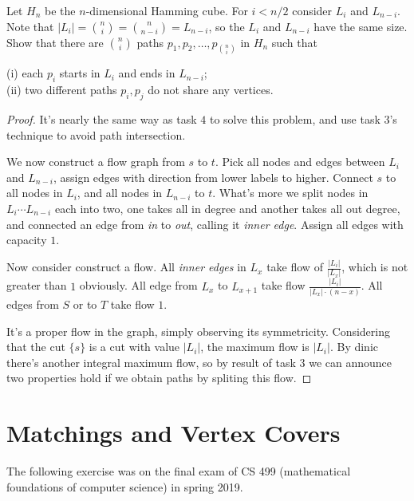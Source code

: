 \documentclass[11pt,a4paper,oneside]{article}
\begin{document}
\begin{problem}{5}
	\statement
  Let $H_n$ be the $n$-dimensional Hamming cube. For $i < n/2$ consider
  $L_i$ and $L_{n-i}$. Note that 
  $|L_i| = {n \choose i} = { n \choose n-i}  = L_{n-i}$, so the 
  $L_i$ and $L_{n-i}$ have the same size.   Show that there are ${n \choose i}$ paths $p_1,p_2,\dots,p_{ {n \choose i}}$
  in $H_n$ such that

  (i) each $p_i$ starts in $L_i$ and ends in $L_{n-i}$; \\
  (ii) two different paths $p_i,p_j$ do not share any vertices.
  
    \solution
    \begin{proof}
      It's nearly the same way as task $4$ to solve this problem, and use task $3$'s technique to avoid path intersection.  

      We now construct a flow graph from $s$ to $t$. Pick all nodes and edges between $L_i$ and $L_{n - i}$, assign edges with direction from lower labels to higher. Connect $s$ to all nodes in $L_i$, and all nodes in $L_{n - i}$ to $t$. What's more we split nodes in $L_i \cdots L_{n - i}$ each into two, one takes all in degree and another takes all out degree, and connected an edge from \textit{in} to \textit{out}, calling it \textit{inner edge}. Assign all edges with capacity $1$.

      Now consider construct a flow. All \textit{inner edges} in $L_x$ take flow of $\frac {|L_i|} {|L_x|}$, which is not greater than $1$ obviously. All edge from $L_{x}$ to $L_{x + 1}$ take flow $\frac {|L_i|} {|L_x| \cdot (n - x)}$. All edges from $S$ or to $T$ take flow $1$.
      
      It's a proper flow in the graph, simply observing its symmetricity. Considering that the cut $\{s\}$ is a cut with value $|L_i|$, the maximum flow is $|L_i|$. By dinic there's another integral maximum flow, so by result of task $3$ we can announce two properties hold if we obtain paths by spliting this flow.
    \end{proof}
\end{problem}


\section*{Matchings and Vertex Covers}

The following exercise was on the final exam of CS 499 (mathematical foundations of computer science) in spring 2019.
\end{document}
